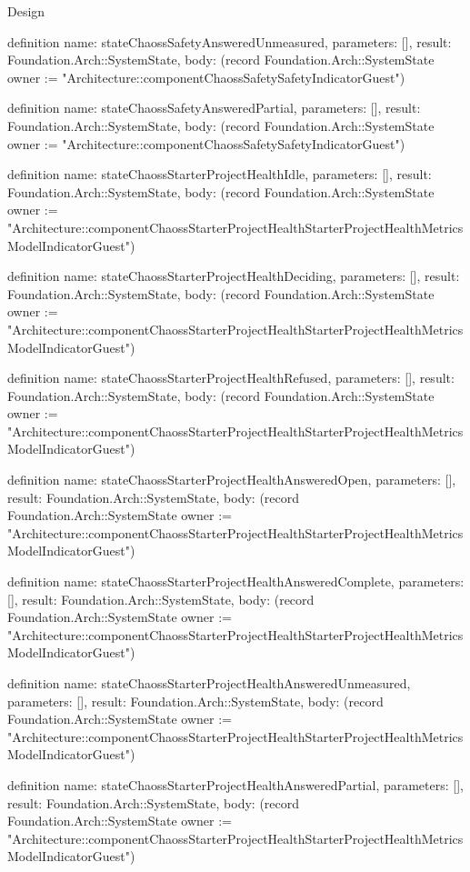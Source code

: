 \begin{lexlean}{Design}
\begin{semanticmodule}
definition{
  name: stateChaossSafetyAnsweredUnmeasured,
  parameters: [],
  result: Foundation.Arch::SystemState,
  body: (record Foundation.Arch::SystemState {owner := "Architecture::componentChaossSafetySafetyIndicatorGuest"})
}

definition{
  name: stateChaossSafetyAnsweredPartial,
  parameters: [],
  result: Foundation.Arch::SystemState,
  body: (record Foundation.Arch::SystemState {owner := "Architecture::componentChaossSafetySafetyIndicatorGuest"})
}

definition{
  name: stateChaossStarterProjectHealthIdle,
  parameters: [],
  result: Foundation.Arch::SystemState,
  body: (record Foundation.Arch::SystemState {owner := "Architecture::componentChaossStarterProjectHealthStarterProjectHealthMetricsModelIndicatorGuest"})
}

definition{
  name: stateChaossStarterProjectHealthDeciding,
  parameters: [],
  result: Foundation.Arch::SystemState,
  body: (record Foundation.Arch::SystemState {owner := "Architecture::componentChaossStarterProjectHealthStarterProjectHealthMetricsModelIndicatorGuest"})
}

definition{
  name: stateChaossStarterProjectHealthRefused,
  parameters: [],
  result: Foundation.Arch::SystemState,
  body: (record Foundation.Arch::SystemState {owner := "Architecture::componentChaossStarterProjectHealthStarterProjectHealthMetricsModelIndicatorGuest"})
}

definition{
  name: stateChaossStarterProjectHealthAnsweredOpen,
  parameters: [],
  result: Foundation.Arch::SystemState,
  body: (record Foundation.Arch::SystemState {owner := "Architecture::componentChaossStarterProjectHealthStarterProjectHealthMetricsModelIndicatorGuest"})
}

definition{
  name: stateChaossStarterProjectHealthAnsweredComplete,
  parameters: [],
  result: Foundation.Arch::SystemState,
  body: (record Foundation.Arch::SystemState {owner := "Architecture::componentChaossStarterProjectHealthStarterProjectHealthMetricsModelIndicatorGuest"})
}

definition{
  name: stateChaossStarterProjectHealthAnsweredUnmeasured,
  parameters: [],
  result: Foundation.Arch::SystemState,
  body: (record Foundation.Arch::SystemState {owner := "Architecture::componentChaossStarterProjectHealthStarterProjectHealthMetricsModelIndicatorGuest"})
}

definition{
  name: stateChaossStarterProjectHealthAnsweredPartial,
  parameters: [],
  result: Foundation.Arch::SystemState,
  body: (record Foundation.Arch::SystemState {owner := "Architecture::componentChaossStarterProjectHealthStarterProjectHealthMetricsModelIndicatorGuest"})
}


\end{semanticmodule}
\end{lexlean}
